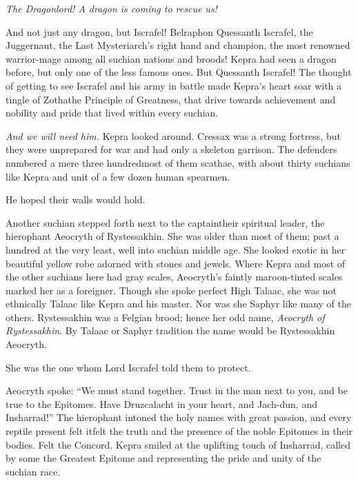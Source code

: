 \documentclass
  [a4paper,
   12pt,
   oneside
  ]%
  {article}
\begin{document}
\emph{The Dragonlord! A dragon is coming to rescue us!} 

And not just any dragon, but Iscrafel! Belraphon Quessanth Iscrafel, the Juggernaut, the Last Mysteriarch's right hand and champion, the most renowned warrior-mage among all suchian nations and broods! 
Kepra had seen a dragon before, but only one of the less famous ones.
But Quessanth Iscrafel! The thought of getting to see Iscrafel and his army in battle made Kepra's heart soar with a tingle of Zotha\dash{}the Principle of Greatness, that drive towards achievement and nobility and pride that lived within every suchian.

\emph{And we will need him.} 
Kepra looked around. 
Cressax was a strong fortress, but they were unprepared for war and had only a skeleton garrison.
The defenders numbered a mere three hundred\dash{}most of them scathae, with about thirty suchians like Kepra and unit of a few dozen human spearmen.

He hoped their walls would hold. 


Another suchian stepped forth next to the captain\dash{}their spiritual leader, the hierophant Aeocryth of Rystessakhin.
She was older than most of them; past a hundred at the very least, well into suchian middle age.
She looked exotic in her beautiful yellow robe adorned with stones and jewels. 
Where Kepra and most of the other suchians here had gray scales, Aeocryth’s faintly maroon-tinted scales marked her as a foreigner. 
Though she spoke perfect High Talaac, she was not ethnically Talaac like Kepra and his master. Nor was she Saphyr like many of the others. 
Rystessakhin was a Felgian brood; hence her odd name, \emph{Aeocryth of Rystessakhin}. 
By Talaac or Saphyr tradition the name would be Rystessakhin Aeocryth. 

She was the one whom Lord Iscrafel told them to protect.

Aeocryth spoke: ``We must stand together. Trust in the man next to you, and be true to the Epitomes. Have Druzcalacht in your heart, and Jach-dun, and Insharrad!'' 
The hierophant intoned the holy names with great passion, and every reptile present felt it\dash{}felt the truth and the presence of the noble Epitomes in their bodies. 
Felt the Concord. 
Kepra smiled at the uplifting touch of Insharrad, called by some the Greatest Epitome and representing the pride and unity of the suchian race.
\end{document}
